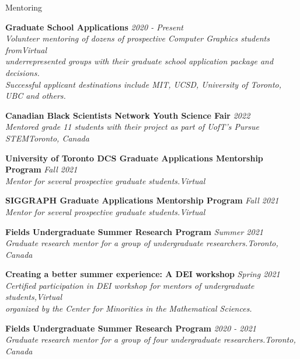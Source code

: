 \documentclass{resume} %
\begin{document}
\begin{rSection}{Mentoring}

{\bf Graduate School Applications} \hfill {\em 2020 - Present}\\ 
{\it Volunteer mentoring of dozens of prospective Computer Graphics students from}\hfill {\em Virtual}\\
{\it underrepresented groups with their graduate school application package and decisions.}\\
{\it Successful applicant destinations include MIT, UCSD, University of Toronto, UBC and others.}

{\bf Canadian Black Scientists Network Youth Science Fair} \hfill {\em 2022}\\ 
{\it Mentored grade 11 students with their project as part of UofT's Pursue STEM}\hfill {\em Toronto, Canada}

{\bf University of Toronto DCS Graduate Applications Mentorship Program} \hfill {\em Fall 2021}\\ 
{\it Mentor for several prospective graduate students.}\hfill {\em Virtual}

{\bf SIGGRAPH Graduate Applications Mentorship Program} \hfill {\em Fall 2021}\\ 
{\it Mentor for several prospective graduate students.}\hfill {\em Virtual}

{\bf Fields Undergraduate Summer Research Program} \hfill {\em Summer 2021}\\ 
{\it Graduate research mentor for a group of undergraduate researchers.}\hfill {\em Toronto, Canada}

{\bf Creating a better summer experience: A DEI workshop} \hfill  {\em Spring 2021} \\ 
{\it Certified participation in DEI workshop for mentors of undergraduate students,}\hfill {\em Virtual}\\
{\it organized by the Center for Minorities in the Mathematical Sciences.}

{\bf Fields Undergraduate Summer Research Program} \hfill {\em 2020 - 2021}\\ 
{\it Graduate research mentor for a group of four undergraduate researchers.}\hfill {\em Toronto, Canada}

\end{rSection}
\end{document}

